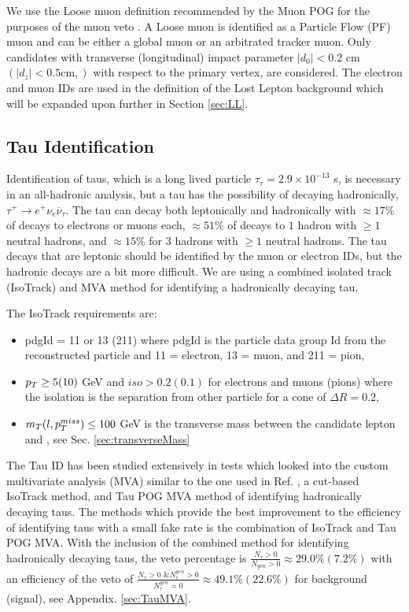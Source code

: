  We use the Loose muon definition recommended by the Muon POG for the purposes of the muon veto \cite{noauthor_https://twiki.cern.ch/twiki/bin/view/cmspublic/swguidemuonidloose_muon_nodate}. A Loose muon is identified as a Particle Flow (PF)\cite{noauthor_cms_nodate} muon and can be either a global muon or an arbitrated tracker muon. Only candidates with transverse (longitudinal) impact parameter $|d_0|<0.2$ cm $(|d_z|<0.5 \text{cm},)$ with respect to the primary vertex, are considered. The electron and muon IDs are used in the definition of the Lost Lepton background which will be expanded upon further in Section \ref{sec:LL}. 
 
\subsection{Tau Identification}\label{TauID}
Identification of taus, which is a long lived particle $\tau_\tau=2.9\times10^{-13}$ s, is necessary in an all-hadronic analysis, but a tau has the possibility of decaying hadronically, $\tau^+\rightarrow e^+ \nu_e\overline{\nu}_\tau$. The tau can decay both leptonically and hadronically with $\approx17\%$ of decays to electrons or muons each, $\approx51\%$ of decays to $1$ hadron with $\geq1$ neutral hadrons, and $\approx15\%$ for 3 hadrons with $\geq1$ neutral hadrons. The tau decays that are leptonic should be identified by the muon or electron IDs, but the hadronic decays are a bit more difficult. We are using a combined isolated track (IsoTrack) and MVA method for identifying a hadronically decaying tau. 

The IsoTrack requirements are:
\begin{itemize}
	\item pdgId = 11 or 13 (211) where pdgId is the particle data group Id from the reconstructed particle and 11 = electron, 13 = muon, and 211 = pion,
	\item $p_{T}\geq5(10)$ GeV and $iso>0.2(0.1)$ for electrons and muons (pions) where the isolation is the separation from other particle for a cone of $\Delta R=0.2$,
	\item $m_T(l,p_{T}^{miss})\leq100$ GeV is the transverse mass between the candidate lepton and \met, see Sec. \ref{sec:transverseMass}
\end{itemize}

The Tau ID has been studied extensively in tests which looked into the custom multivariate analysis (MVA) \cite{roe_boosted_2004, hoecker_tmva_2007, bravo_search_2015} similar to the one used in Ref. \cite{cms_collaboration_search_2016}, a cut-based IsoTrack method, and Tau POG MVA method of identifying hadronically decaying taus. The methods which provide the best improvement to the efficiency of identifying taus with a small fake rate is the combination of IsoTrack and Tau POG MVA. With the inclusion of the combined method for identifying hadronically decaying taus, the veto percentage is $\frac{N_\tau>0}{N_{gen}>0}\approx29.0\%(7.2\%)$ with an efficiency of the veto of $\frac{N_\tau>0\text{ \& }N_\tau^{gen}>0}{N_\tau^{gen}=0}\approx49.1\%(22.6\%)$ for \ttbar{} background (signal), see Appendix. \ref{sec:TauMVA}. 

